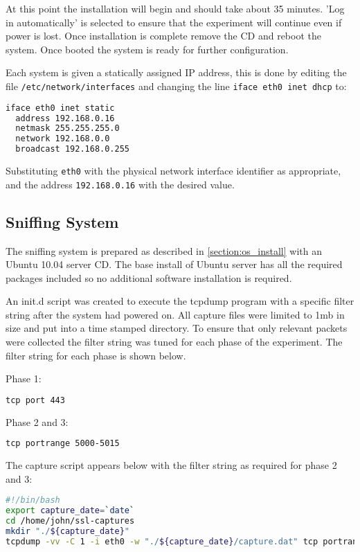 At this point the installation will begin and should take about 35 minutes.
'Log in automatically' is selected to ensure that the experiment will continue
even if power is lost. Once installation is complete remove the CD and reboot
the system. Once booted the system is ready for further configuration.

Each system is given a statically assigned IP address, this is done by editing
the file \verb+/etc/network/interfaces+ and changing the line
\verb+iface eth0 inet dhcp+ to:

\begin{lstlisting}[language=sh]
iface eth0 inet static
  address 192.168.0.16
  netmask 255.255.255.0
  network 192.168.0.0
  broadcast 192.168.0.255
\end{lstlisting}

Substituting \verb+eth0+ with the physical network interface identifier as
appropriate, and the address \verb+192.168.0.16+ with the desired value.

\subsection{Sniffing System}

The sniffing system is prepared as described in \ref{section:os_install} with an
Ubuntu 10.04 server CD. The base install of Ubuntu server has all the required
packages included so no additional software installation is required.

An init.d script was created to execute the tcpdump program with a specific
filter string after the system had powered on. All capture files were limited to
1mb in size and put into a time stamped directory. To ensure that only relevant
packets were collected the filter string was tuned for each phase of the
experiment. The filter string for each phase is shown below.

Phase 1:
\begin{lstlisting}[language=sh]
tcp port 443
\end{lstlisting}

Phase 2 and 3:
\begin{lstlisting}[language=sh]
tcp portrange 5000-5015
\end{lstlisting}

The capture script appears below with the filter string as required for phase 2
and 3:

\begin{lstlisting}[language=sh]
#!/bin/bash
export capture_date=`date`
cd /home/john/ssl-captures
mkdir "./${capture_date}"
tcpdump -vv -C 1 -i eth0 -w "./${capture_date}/capture.dat" tcp portrange 5001-5015
\end{lstlisting}

